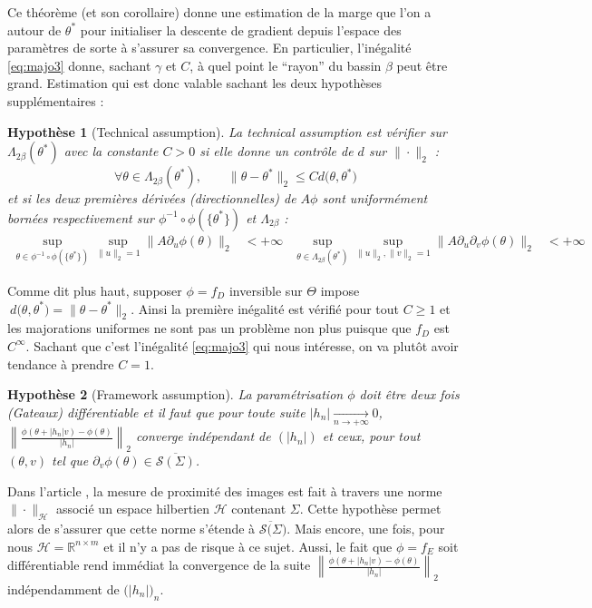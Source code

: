 \documentclass[hidelinks, french]{article} %
\newcommand{\R}{\mathbb{R}}
\newcommand{\lr}{\longrightarrow}
\renewcommand{\leq}{\leqslant}
\renewcommand{\geq}{\geqslant}
\theoremstyle{enonce}
\newtheorem{assump}{Hypothèse}
\theoremstyle{special}
\theoremstyle{rq}
\theoremstyle{exo}
\theoremstyle{demo}
\begin{document}
Ce théorème (et son corollaire) donne une estimation de la marge que l'on a autour de $\theta^*$ pour initialiser la descente de gradient depuis l'espace des paramètres de sorte à s'assurer sa convergence. En particulier, l'inégalité \ref{eq:majo3} donne, sachant $\gamma$ et $C$, à quel point le ``rayon'' du bassin $\beta$ peut être grand.
Estimation qui est donc valable sachant les deux hypothèses supplémentaires :
\\
\begin{assump}[Technical assumption]\label{hyp:technical}
La \emph{technical assumption} est vérifier sur $\Lambda_{2\beta}(\theta^*)$ avec la constante $C>0$ si elle donne un contrôle de $d$ sur $\|\cdot\|_2$ :
\[\forall\theta\in\Lambda_{2\beta}(\theta^*),\qquad \big\|\theta-\theta^*\big\|_2\leq C d\big(\theta, \theta^*\big)\]
et si les deux premières dérivées (directionnelles) de $A\phi$ sont uniformément bornées respectivement sur $\phi^{-1}\circ\phi(\{\theta^*\})$ et $\Lambda_{2\beta}$ :
\begin{align*}\sup_{\theta\in\phi^{-1}\circ\phi(\{\theta^*\})}\sup_{\|u\|_2=1}\big\|A\partial_u\phi(\theta)\big\|_2&<+\infty  &  \sup_{\theta\in\Lambda_{2\beta}(\theta^*)}\sup_{\|u\|_2,\|v\|_2=1}\big\|A\partial_u\partial_v\phi(\theta)\big\|_2&<+\infty 
\end{align*}
\end{assump}

Comme dit plus haut, supposer $\phi=f_D$ inversible sur $\Theta$ impose $\ d\big(\theta, \theta^*\big)=\big\|\theta-\theta^*\big\|_2$. Ainsi la première inégalité est vérifié pour tout $C\geq1$ et les majorations uniformes ne sont pas un problème non plus puisque que $f_D$ est $C^\infty$. Sachant que c'est l'inégalité \ref{eq:majo3} qui nous intéresse, on va plutôt avoir tendance à prendre $C=1$.
\\

\begin{assump}[Framework assumption]\label{hyp:framework}
La paramétrisation $\phi$ doit être deux fois (Gateaux) différentiable et il faut que pour toute suite $|h_n|\xrightarrow[n\lr+\infty]{} 0$, $\left\|\frac{\phi(\theta +|h_n|v)-\phi(\theta)}{|h_n|}\right\|_2$ converge indépendant de $(|h_n|)$ et ceux, pour tout $(\theta,v)$ tel que $\partial_v\phi(\theta)\in\overline{\mathcal{S}(\Sigma)}$.
\end{assump}

Dans l'article \cite{traonmilin_basins_2022}, la mesure de proximité des images est fait à travers une norme $\|\cdot\|_\mathcal{H}$ associé un espace hilbertien $\mathcal{H}$ contenant $\Sigma$. Cette hypothèse permet alors de s'assurer que cette norme s'étende à $\overline{\mathcal{S}(\Sigma})$. Mais encore, une fois, pour nous $\mathcal{H}=\R^{n\times m}$ et il n'y a pas de risque à ce sujet. Aussi, le fait que $\phi=f_E$ soit différentiable rend immédiat la convergence de la suite $\left\|\frac{\phi(\theta +|h_n|v)-\phi(\theta)}{|h_n|}\right\|_2$ indépendamment de $\big(|h_n|\big)_n$.
\\ \\
\end{document}
